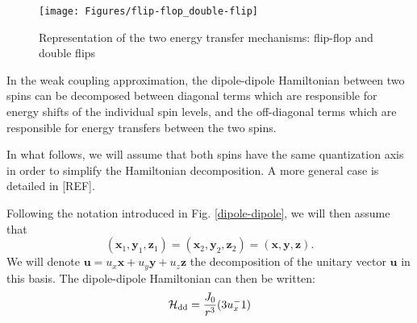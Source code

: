 \documentclass[a4paper,11pt]{report}
\begin{document}
\begin{figure}[h!]
\centering
\texttt{[image: Figures/flip-flop\_double-flip]}
\caption{Representation of the two energy transfer mechanisms: flip-flop and double flips} 
\label{flip flop double flip}
\end{figure}

In the weak coupling approximation, the dipole-dipole Hamiltonian between two spins can be decomposed between diagonal terms which are responsible for energy shifts of the individual spin levels, and the off-diagonal terms which are responsible for energy transfers between the two spins.

In what follows, we will assume that both spins have the same quantization axis in order to simplify the Hamiltonian decomposition. A more general case is detailed in [REF].

Following the notation introduced in Fig. \ref{dipole-dipole}, we will then assume that $$(\mathbf{x}_1,\mathbf{y}_1,\mathbf{z}_1) = (\mathbf{x}_2,\mathbf{y}_2,\mathbf{z}_2) = (\mathbf{x},\mathbf{y},\mathbf{z}).$$ We will denote $\mathbf{u}=u_x \mathbf{x} + u_y \mathbf{y} + u_z \mathbf{z}$ the decomposition of the unitary vector $\mathbf{u}$ in this basis. The dipole-dipole Hamiltonian can then be written:
\begin{equation}
\mathcal{H}_{\rm dd}=\frac{J_0}{r^3} (3 u_x^-1)
\end{equation}
\printbibliography
\end{document}
